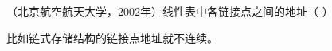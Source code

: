 \question （北京航空航天大学，2002年）线性表中各链接点之间的地址（ ）
\par{}
\begin{solution}比如链式存储结构的链接点地址就不连续。
\end{solution}
